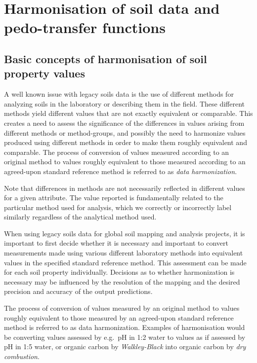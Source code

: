 \documentclass[graybox,natbib,nospthms,UStrade]{svmono}
\begin{document}
\hypertarget{harmonisation-of-soil-data-and-pedo-transfer-functions}{%
\section{Harmonisation of soil data and pedo-transfer functions}\label{harmonisation-of-soil-data-and-pedo-transfer-functions}}

\hypertarget{basic-concepts-of-harmonisation-of-soil-property-values}{%
\subsection{Basic concepts of harmonisation of soil property values}\label{basic-concepts-of-harmonisation-of-soil-property-values}}

A well known issue with legacy soils data is the use of different
methods for analyzing soils in the laboratory or describing them in the
field. These different methods yield different values that are not
exactly equivalent or comparable. This creates a need to assess the
significance of the differences in values arising from different methods
or method-groups, and possibly the need to harmonize values produced
using different methods in order to make them roughly equivalent and
comparable. The process of conversion of values measured according to an
original method to values roughly equivalent to those measured according
to an agreed-upon standard reference method is referred to as \emph{data
harmonization}.

Note that differences in methods are not necessarily reflected in
different values for a given attribute. The value reported is
fundamentally related to the particular method used for analysis, which
we correctly or incorrectly label similarly regardless of the analytical
method used.

When using legacy soils data for global soil mapping and analysis
projects, it is important to first decide whether it is necessary and
important to convert measurements made using various different
laboratory methods into equivalent values in the specified standard
reference method. This assessment can be
made for each soil property individually. Decisions as to whether
harmonization is necessary may be influenced by the resolution of the
mapping and the desired precision and accuracy of the output
predictions.

The process of conversion of values measured by an original method to
values roughly equivalent to those measured by an agreed-upon standard
reference method is referred to as data harmonization. Examples of
harmonisation would be converting values assessed by e.g.~pH in 1:2
water to values as if assessed by pH in 1:5 water, or organic carbon by
\emph{Walkley-Black} into organic carbon by \emph{dry combustion}.
\end{document}

